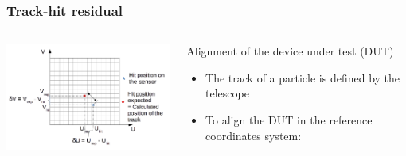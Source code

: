 \documentclass{beamer}
\begin{document}
\begin{frame}
    \frametitle{Track-hit residual}

    \begin{columns}[t]
      \begin{column}{7cm}
        \begin{center}
          \includegraphics[width = 7cm]{Pictures/residual_explanation.png}
        \end{center}
      \end{column}
      \begin{column}{4cm}
        \scriptsize{
        \begin{block}{Alignment of the device under test (DUT)}
          \begin{itemize}
            \item The track of a particle is defined by the telescope
            \item To align the DUT in the reference coordinates system:
          \end{itemize}
        \end{block}
      }
      \end{column}
    \end{columns}
\end{frame}
\end{document}
